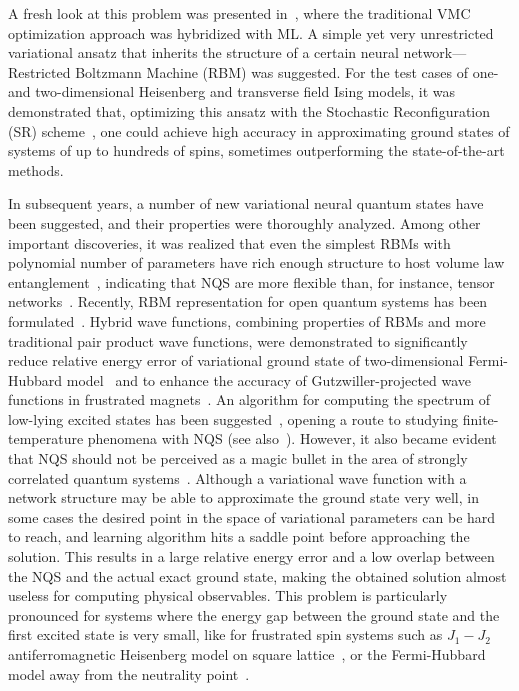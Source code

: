 A fresh look at this problem was presented in~\cite{Carleo}, where the traditional VMC optimization approach was hybridized with ML. A simple yet very unrestricted variational ansatz that inherits the structure of a certain neural network---Restricted Boltzmann Machine (RBM) was suggested. For the test cases of one- and two-dimensional Heisenberg and transverse field Ising models, it was demonstrated that, optimizing this ansatz with the Stochastic Reconfiguration (SR) scheme~\cite{sorella2007weak}, one could achieve high accuracy in approximating ground states of systems of up to hundreds of spins, sometimes outperforming the state-of-the-art methods.

In subsequent years, a number of new variational neural quantum states have been suggested, and their properties were thoroughly analyzed. Among other important discoveries, it was realized that even the simplest RBMs with polynomial number of parameters have rich enough structure to host volume law entanglement~\cite{Deng,levine2019quantum}, indicating that NQS are more flexible than, for instance, tensor networks~\cite{Orus}. Recently, RBM representation for open quantum systems has been formulated~\cite{torlai2018latent,PhysRevLett.122.250503,PhysRevLett.122.250502}. Hybrid wave functions, combining properties of RBMs and more traditional pair product wave functions, were demonstrated to significantly reduce relative energy error of variational ground state of two-dimensional Fermi-Hubbard model~\cite{Nomura} and to enhance the accuracy of Gutzwiller-projected wave functions in frustrated magnets~\cite{ferrari2019neural}. An algorithm for computing the spectrum of low-lying excited states has been suggested~\cite{Choo}, opening a route to studying finite-temperature phenomena with NQS (see also~\cite{irikura2019neural}). However, it also became evident that NQS should not be perceived as a magic bullet in the area of strongly correlated quantum systems~\cite{park2019geometry}. Although a variational wave function with a network structure may be able to approximate the ground state very well, in some cases the desired point in the space of variational parameters can be hard to reach, and learning algorithm hits a saddle point before approaching the solution. This results in a large relative energy error and a low overlap between the NQS and the actual exact ground state, making the obtained solution almost useless for computing physical observables. This problem is particularly pronounced for systems where the energy gap between the ground state and the first excited state is very small, like for frustrated spin systems such as $J_1-J_2$ antiferromagnetic Heisenberg model on square lattice~\cite{Liang}, or the Fermi-Hubbard model away from the neutrality point~\cite{Luo}.

